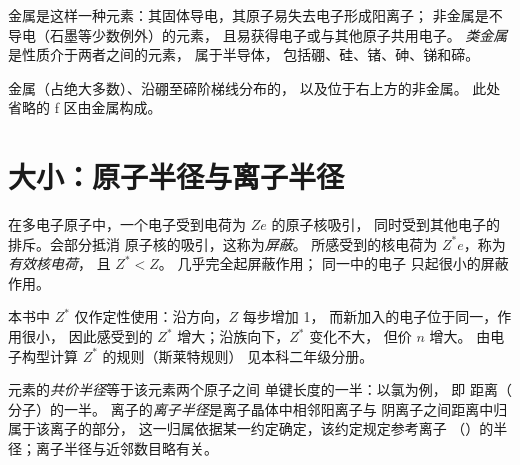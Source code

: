 \begin{definition}\label{def:b1:periodicity:metalloid}
金属是这样一种元素：其固体导电，其原子易失去电子形成阳离子；
非金属是不导电（石墨等少数例外）的元素，
且易获得电子或与其他原子共用电子。
\emph{类金属}是性质介于两者之间的元素，
属于半导体，
包括硼、硅、锗、砷、锑和碲。
\end{definition}

\begin{omfigure}
\omperiodictable[colour=metals, legend, f block=false]

{\small 金属（占绝大多数）、沿硼至碲阶梯线分布的，
以及位于右上方的非金属。
此处省略的 f 区由金属构成。}
\end{omfigure}

\section{大小：原子半径与离子半径}

\begin{definition}[屏蔽、有效核电荷]\label{def:b1:periodicity:screening}
在多电子原子中，一个电子受到电荷为 $Ze$ 的原子核吸引，
同时受到其他电子的排斥。会部分抵消
原子核的吸引，这称为\emph{屏蔽}。
所感受到的核电荷为 $Z^{*}e$，称为\emph{有效核电荷}，
且 $Z^{*} < Z$。
几乎完全起屏蔽作用；
同一中的电子
只起很小的屏蔽作用。
\end{definition}

\begin{remark}[定性工具]\label{rem:b1:periodicity:slater}
本书中 $Z^{*}$ 仅作定性使用：沿方向，$Z$ 每步增加 1，
而新加入的电子位于同一，作用很小，
因此感受到的 $Z^{*}$ 增大；沿族向下，$Z^{*}$ 变化不大，
但价 $n$ 增大。
由电子构型计算 $Z^{*}$ 的规则（斯莱特规则）
见本科二年级分册。
\end{remark}

\begin{definition}\label{def:b1:periodicity:radius}
元素的\emph{共价半径}等于该元素两个原子之间
单键长度的一半：以氯为例，
即  距离（ 分子）的一半。
离子的\emph{离子半径}是离子晶体中相邻阳离子与
阴离子之间距离中归属于该离子的部分，
这一归属依据某一约定确定，该约定规定参考离子
（）的半径；离子半径与近邻数目略有关。
\end{definition}

